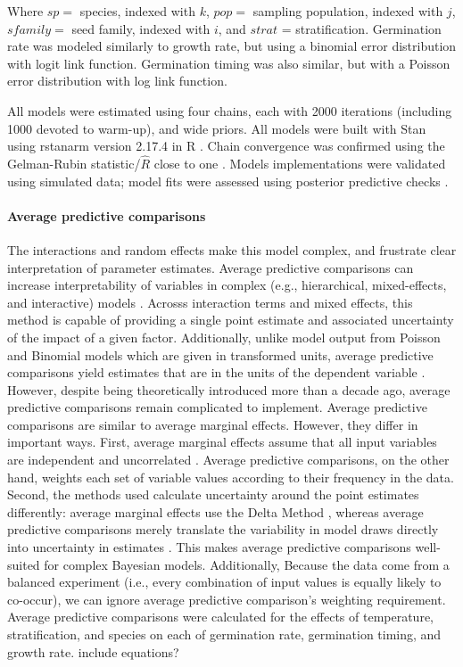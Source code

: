 \documentclass[12pt]{article}\usepackage[]{graphicx}\usepackage[]{color}
\begin{document}
	 Where $sp = $ species, indexed with $k$, $pop =$ sampling population, indexed with $j$, $sfamily =$ seed family, indexed with $i$, and $strat$ = stratification. Germination rate was modeled similarly to growth rate, but using a binomial error distribution with logit link function. Germination timing was also similar, but with a Poisson error distribution with log link function.  
	 	
	All models were estimated using four chains, each with 2000 iterations (including 1000 devoted to warm-up), and wide priors. All models were built with Stan \parencite{Carpenter2017} using rstanarm version 2.17.4 \parencite{Goodrich2018} in R \parencite{Team2015}. Chain convergence was confirmed using the Gelman-Rubin statistic/$\hat{R}$ close to one \parencite{Gelman1992}. Models implementations were validated using simulated data; model fits were assessed using posterior predictive checks \parencite{Gelman2004}.  
	
	\paragraph{Average predictive comparisons} The interactions and random effects make this model complex, and frustrate clear interpretation of parameter estimates. Average predictive comparisons can increase interpretability of variables in complex (e.g., hierarchical, mixed-effects, and interactive) models \parencite{Gelman2007}. Acrosss interaction terms and mixed effects, this method is capable of providing a single point estimate and associated uncertainty of the impact of a given factor. Additionally, unlike model output from Poisson and Binomial models which are given in transformed units, average predictive comparisons yield estimates that are in the units of the dependent variable \parencite{Gelman2007}. However, despite being theoretically introduced more than a decade ago, average predictive comparisons remain complicated to implement. Average predictive comparisons are similar to average marginal effects. However, they differ in important ways. First, average marginal effects assume that all input variables are independent and uncorrelated \parencite{Williams2012}. Average predictive comparisons, on the other hand, weights each set of variable values according to their frequency in the data. Second, the methods used calculate uncertainty around the point estimates differently: average marginal effects use the Delta Method \parencite{Williams2012}, whereas average predictive comparisons merely translate the variability in model draws directly into uncertainty in estimates \parencite{Gelman2007}. This makes average predictive comparisons well-suited for complex Bayesian models. Additionally, Because the data come from a balanced experiment  (i.e., every combination of input values is equally likely to co-occur), we can ignore average predictive comparison's weighting requirement. Average predictive comparisons were calculated for the effects of temperature, stratification, and species on each of germination rate, germination timing, and growth rate. \color{red} include equations? \color{black}
	
\end{document}
